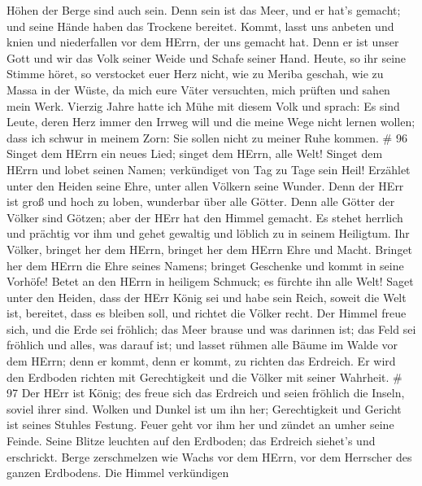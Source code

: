 Höhen der Berge sind auch sein.  Denn sein ist das Meer, und
er hat's gemacht; und seine Hände haben das Trockene bereitet.
 Kommt, lasst uns anbeten und knien und niederfallen vor dem
HErrn, der uns gemacht hat.  Denn er ist unser Gott und wir
das Volk seiner Weide und Schafe seiner Hand. Heute, so ihr seine Stimme
höret,  so verstocket euer Herz nicht, wie zu Meriba
geschah, wie zu Massa in der Wüste,  da mich eure Väter
versuchten, mich prüften und sahen mein Werk.  Vierzig
Jahre hatte ich Mühe mit diesem Volk und sprach: Es sind Leute, deren
Herz immer den Irrweg will und die meine Wege nicht lernen wollen;
 dass ich schwur in meinem Zorn: Sie sollen nicht zu meiner
Ruhe kommen. \# 96  Singet dem HErrn ein neues Lied; singet
dem HErrn, alle Welt!  Singet dem HErrn und lobet seinen
Namen; verkündiget von Tag zu Tage sein Heil!  Erzählet
unter den Heiden seine Ehre, unter allen Völkern seine Wunder.
 Denn der HErr ist groß und hoch zu loben, wunderbar über
alle Götter.  Denn alle Götter der Völker sind Götzen; aber
der HErr hat den Himmel gemacht.  Es stehet herrlich und
prächtig vor ihm und gehet gewaltig und löblich zu in seinem Heiligtum.
 Ihr Völker, bringet her dem HErrn, bringet her dem HErrn
Ehre und Macht.  Bringet her dem HErrn die Ehre seines
Namens; bringet Geschenke und kommt in seine Vorhöfe!  Betet
an den HErrn in heiligem Schmuck; es fürchte ihn alle Welt!
 Saget unter den Heiden, dass der HErr König sei und habe
sein Reich, soweit die Welt ist, bereitet, dass es bleiben soll, und
richtet die Völker recht.  Der Himmel freue sich, und die
Erde sei fröhlich; das Meer brause und was darinnen ist; 
das Feld sei fröhlich und alles, was darauf ist; und lasset rühmen alle
Bäume im Walde  vor dem HErrn; denn er kommt, denn er
kommt, zu richten das Erdreich. Er wird den Erdboden richten mit
Gerechtigkeit und die Völker mit seiner Wahrheit. \# 97  Der
HErr ist König; des freue sich das Erdreich und seien fröhlich die
Inseln, soviel ihrer sind.  Wolken und Dunkel ist um ihn
her; Gerechtigkeit und Gericht ist seines Stuhles Festung. 
Feuer geht vor ihm her und zündet an umher seine Feinde. 
Seine Blitze leuchten auf den Erdboden; das Erdreich siehet's und
erschrickt.  Berge zerschmelzen wie Wachs vor dem HErrn, vor
dem Herrscher des ganzen Erdbodens.  Die Himmel verkündigen

